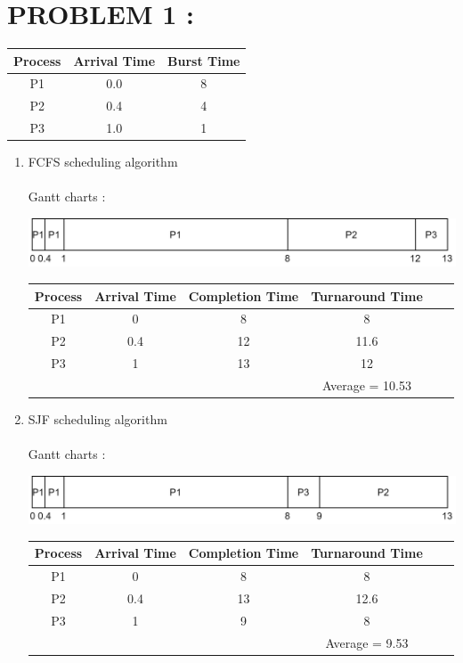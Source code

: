 \documentclass[a4paper]{article}
\begin{document}

\newpage
\tableofcontents
\newpage

\section{PROBLEM 1 :}
\begin{center}
\begin{tabular}{c|c|c}
Process & Arrival Time & Burst Time \\
\hline
P1 & 0.0 & 8 \\
P2 & 0.4 & 4 \\
P3 & 1.0 & 1 \\
\end{tabular}
\end{center}
\begin{enumerate}[label=\alph*)]
\item FCFS scheduling algorithm \\
\\
Gantt charts : \\
\begin{center}
\includegraphics[scale=1]{ex1 fcfs.png}
\end{center}
\begin{center}
\begin{tabular}{|c|c|c|c|c|c|}
\hline
Process & Arrival Time & Completion Time & Turnaround Time \\
\hline
P1 & 0 & 8 & 8 \\
\hline
P2 & 0.4 & 12 & 11.6 \\
\hline
P3 & 1 & 13 & 12 \\
\hline
&&& Average = 10.53 \\ 
\hline
\end{tabular}
\end{center}

\item SJF scheduling algorithm \\
\\
Gantt charts : \\
\begin{center}
\includegraphics[scale=1]{ex1 sjf.png}
\end{center}
\begin{center}
\begin{tabular}{|c|c|c|c|c|c|}
\hline
Process & Arrival Time & Completion Time & Turnaround Time \\
\hline
P1 & 0 & 8 & 8 \\
\hline
P2 & 0.4 & 13 & 12.6 \\
\hline
P3 & 1 & 9 & 8 \\
\hline
&&& Average = 9.53 \\ 
\hline
\end{tabular}
\end{center}


\end{enumerate}
\end{document}
